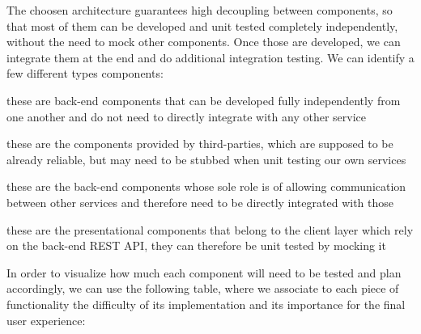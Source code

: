 
The choosen architecture guarantees high decoupling between components, so that most of them
can be developed and unit tested completely independently, without the need to mock other
components. Once those are developed, we can integrate them at the end and do additional
integration testing. We can identify a few different types components:

\begin{description}[leftmargin=0pt]
    \item[Independent components:] these are back-end components that can be developed fully independently
          from one another and do not need to directly integrate with any other service
    \item[External components:] these are the components provided by third-parties, which are supposed
          to be already reliable, but may need to be stubbed when unit testing our own services
    \item[Integrating components:] these are the back-end components whose sole role is of allowing
          communication between other services and therefore need to be directly integrated with those
    \item[Front-end components:] these are the presentational components that belong to the client layer
          which rely on the back-end REST API, they can therefore be unit tested by mocking it
\end{description}

In order to visualize how much each component will need to be tested and plan accordingly, we can use
the following table, where we associate to each piece of functionality the difficulty of its
implementation and its importance for the final user experience:

